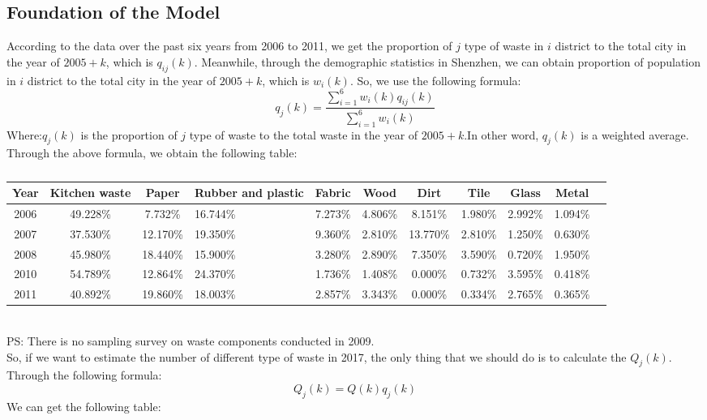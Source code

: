 \documentclass[UTF8]{article}
\begin{document}
\subsection{Foundation of the Model}
\indent According to the data over the past six years from 2006 to 2011, we get the proportion of \(j\) type of waste in \(i\) district to the total city in the year of \(2005+k\), which is \(q_{ij}(k)\). Meanwhile, through the demographic statistics in Shenzhen, we can obtain proportion of population in \(i\) district to the total city in the year of \(2005+k\), which is \(w_i(k)\). So, we use the following formula:
\[q_j(k)=\frac{\sum\limits_{i=1}^{6} w_i(k)q_{ij}(k)}{\sum\limits_{i=1}^{6} w_i(k)}\]
\indent Where:\(q_j(k)\) is the proportion of \(j\) type of waste to the total waste in the year of \(2005+k\).In other word, \(q_j(k)\) is a weighted average.\\
\indent Through the above formula, we obtain the following table:\\
\begin{table}[h]
\caption{}
\begin{center}
\begin{tabular}{cccp{1cm}ccccccc}
\hline
Year&Kitchen waste&Paper&Rubber and plastic&Fabric&Wood&Dirt&Tile&Glass&Metal\\
\hline
2006&49.228\%&7.732\%&16.744\%&7.273\%&4.806\%&8.151\%&1.980\%&2.992\%&1.094\%\\
\hline
2007&37.530\%&12.170\%&19.350\%&9.360\%&2.810\%&13.770\%&2.810\%&1.250\%&0.630\%\\
\hline
2008&45.980\%&18.440\%&15.900\%&3.280\%&2.890\%&7.350\%&3.590\%&0.720\%&1.950\%\\
\hline
2010&54.789\%&12.864\%&24.370\%&1.736\%&1.408\%&0.000\%&0.732\%&3.595\%&0.418\%\\
\hline
2011&40.892\%&19.860\%&18.003\%&2.857\%&3.343\%&0.000\%&0.334\%&2.765\%&0.365\%\\
\hline
\end{tabular}
\end{center}
\end{table}\\
\indent PS: There is no sampling survey on waste components conducted in 2009.\\
\indent So, if we want to estimate the number of different type of waste in 2017, the only thing that we should do is to calculate the \(Q_j(k)\). Through the following formula:
\[Q_j(k)=Q(k)q_j(k)\]
\indent We can get the following table:\\
\end{document}
